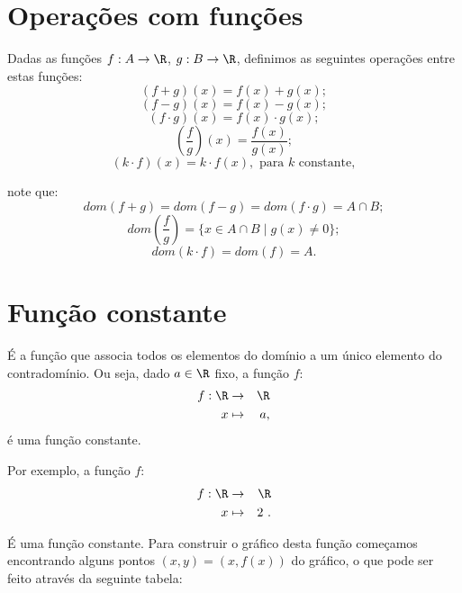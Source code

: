 \section{Operações com funções}
Dadas as funções $f: A \rightarrow \R$, $g: B \rightarrow \R$, definimos as seguintes operações entre estas funções:
\begin{equation}
(f + g)(x)= f(x) + g(x); 
\end{equation}
\begin{equation}
(f - g)(x)= f(x) - g(x); 
\end{equation}
\begin{equation}
(f \cdot g)(x)= f(x) \cdot g(x); 
\end{equation}
\begin{equation}
 \left( \frac{f}{g} \right) (x)= \frac{f(x)}{g(x)} ;
\end{equation}
\begin{equation}
(k \cdot f)(x)= k \cdot f(x), \text{ para } k \text{ constante} ,
\end{equation}

note que:
\begin{equation}
dom(f+g)= dom(f-g)= dom(f \cdot g)= A \cap B ;
\end{equation}
\begin{equation}
 dom\left( \frac{f}{g} \right)= \{x \in A \cap B \mid g(x) \neq 0\}; 
\end{equation}
\begin{equation}
 dom(k \cdot f)= dom(f)= A .
\end{equation}

\section{Função constante}

É a função que associa todos os elementos do domínio a um único elemento do contradomínio. Ou seja, dado $a \in \R$ fixo, a função $f$:
\begin{eqnarray*}
 f: \R & \rightarrow & \R \\
 x & \mapsto & a,
\end{eqnarray*}
é uma função constante.

Por exemplo, a função $f$:
\begin{eqnarray*}
 f: \R & \rightarrow & \R \\
 x & \mapsto & 2 \ .
\end{eqnarray*}

É uma função constante. Para construir o gráfico desta função começamos encontrando alguns pontos $(x, y)= (x, f(x))$ do gráfico, o que pode ser feito através da seguinte tabela:

